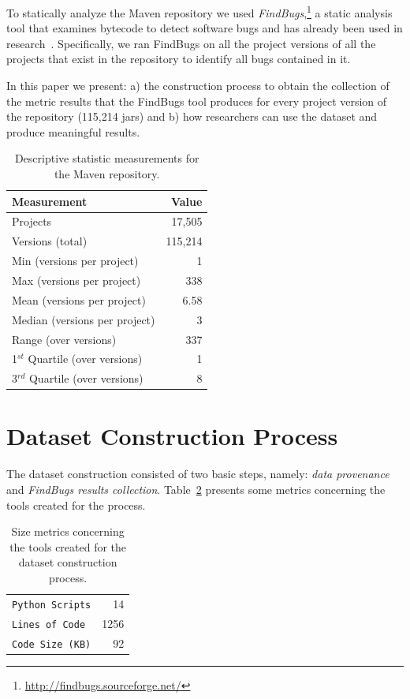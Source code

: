 \documentclass{sig-alternate}
\begin{document}
To statically analyze the Maven repository
we used {\it FindBugs},\footnote{\url{http://findbugs.sourceforge.net/}}
a static analysis tool that examines bytecode to detect software bugs
and has already been used in research~\cite{AP10,SHP06}.
Specifically, we ran FindBugs on all the project versions of all
the projects that exist in the repository
to identify all bugs contained in it.

In this paper we present: a) the construction process to obtain the
collection of the metric results that the FindBugs tool produces 
for every project version of the repository (115,214 {\sc jar}s)
and b) how researchers can use the dataset and produce
meaningful results.

\begin{table}
\centering
\begin{tabular}{l r}
\hline
Measurement & Value\\
 \hline
Projects & 17,505\\
Versions (total) & 115,214\\
Min (versions per project) & 1\\
Max (versions per project) & 338\\
Mean (versions per project) & 6.58\\
Median (versions per project) & 3\\
Range (over versions) & 337\\
1$^{st}$ Quartile (over versions) & 1\\
3$^{rd}$ Quartile (over versions) & 8\\
\hline
\end{tabular}
\caption{Descriptive statistic measurements for the Maven repository.}
\label{tbl:repository}
\end{table}

\section{Dataset Construction Process}
\label{sec:exp}

The dataset construction consisted of two basic steps,
namely: {\it data provenance} and {\it FindBugs results
collection}. Table~\ref{tbl:tools-size} presents some
metrics concerning the tools created for
the process.

\begin{table}
\centering
\begin{tabular}{l r}
 \hline
\verb|Python Scripts| & 14\\
\verb|Lines of Code| & 1256\\
\verb|Code Size (KB)| & 92\\
\hline
\end{tabular}
\caption{Size metrics concerning
the tools created for
the dataset construction process.}
\label{tbl:tools-size}
\end{table}
\end{document}
